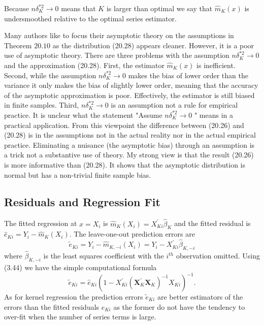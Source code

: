 \documentclass[10pt]{article}
\begin{document}
Because $n \delta_{K}^{* 2} \rightarrow 0$ means that $K$ is larger than optimal we say that $\widehat{m}_{K}(x)$ is undersmoothed relative to the optimal series estimator.

Many authors like to focus their asymptotic theory on the assumptions in Theorem $20.10$ as the distribution (20.28) appears cleaner. However, it is a poor use of asymptotic theory. There are three problems with the assumption $n \delta_{K}^{* 2} \rightarrow 0$ and the approximation (20.28). First, the estimator $\widehat{m}_{K}(x)$ is inefficient. Second, while the assumption $n \delta_{K}^{* 2} \rightarrow 0$ makes the bias of lower order than the variance it only makes the bias of slightly lower order, meaning that the accuracy of the asymptotic approximation is poor. Effectively, the estimator is still biased in finite samples. Third, $n \delta_{K}^{* 2} \rightarrow 0$ is an assumption not a rule for empirical practice. It is unclear what the statement "Assume $n \delta_{K}^{* 2} \rightarrow 0$ " means in a practical application. From this viewpoint the difference between (20.26) and (20.28) is in the assumptions not in the actual reality nor in the actual empirical practice. Eliminating a nuisance (the asymptotic bias) through an assumption is a trick not a substantive use of theory. My strong view is that the result (20.26) is more informative than (20.28). It shows that the asymptotic distribution is normal but has a non-trivial finite sample bias.

\subsection{Residuals and Regression Fit}
The fitted regression at $x=X_{i}$ is $\widehat{m}_{K}\left(X_{i}\right)=X_{K i}^{\prime} \widehat{\beta}_{K}$ and the fitted residual is $\widehat{e}_{K i}=Y_{i}-\widehat{m}_{K}\left(X_{i}\right)$. The leave-one-out prediction errors are
$$
\widetilde{e}_{K i}=Y_{i}-\widehat{m}_{K,-i}\left(X_{i}\right)=Y_{i}-X_{K i}^{\prime} \widehat{\beta}_{K,-i}
$$
where $\widehat{\beta}_{K,-i}$ is the least squares coefficient with the $i^{t h}$ observation omitted. Using (3.44) we have the simple computational formula
$$
\widetilde{e}_{K i}=\widehat{e}_{K i}\left(1-X_{K i}^{\prime}\left(\boldsymbol{X}_{K}^{\prime} \boldsymbol{X}_{K}\right)^{-1} X_{K i}\right)^{-1} .
$$
As for kernel regression the prediction errors $\widetilde{e}_{K i}$ are better estimators of the errors than the fitted residuals $\widehat{e}_{K i}$ as the former do not have the tendency to over-fit when the number of series terms is large.
\end{document}
